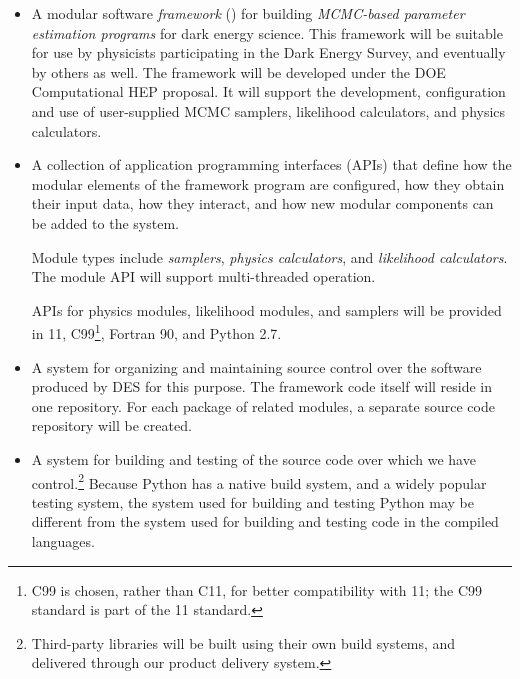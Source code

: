 \documentclass[draftmode,draftwater]{memarticle}
\newcommand{\facs}{\name{FACS}\xspace}
\newcommand{\cosmosis}{\name{CosmoSIS}\xspace}
\begin{document}
\begin{itemize}

\item A modular software \emph{framework} (\cosmosis) for building \emph{MCMC-based
   parameter estimation programs} for dark energy science. This
  framework will be suitable for use by physicists participating in the
  Dark Energy Survey, and eventually by others as well. The framework
  will be developed under the DOE Computational HEP \facs proposal.
  It will
  support the development, configuration and use of
  user-supplied MCMC samplers, likelihood calculators, and physics
  calculators.

\item A collection of application programming interfaces (APIs) that
  define how the modular elements of the framework program are
  configured, how they obtain their input data, how they interact, and
  how new modular components can be added to the system.

  Module types include \emph{samplers}, \emph{physics calculators}, and
  \emph{likelihood calculators}. The module API will support
  multi-threaded operation.


  APIs for physics modules, likelihood modules, and samplers will be provided in
  \cpp{}11, C99\footnote{C99 is chosen, rather than C11, for better
    compatibility with \cpp{}11; the C99 standard is part of the
    \cpp{}11 standard.}, Fortran 90, and Python 2.7.

\item A system for organizing and maintaining source control over the
  software produced by DES for this purpose. The \cosmosis framework code
  itself will reside in one repository. For each package of related
  modules, a separate source code repository will be created.

\item A system for building and testing of the source code over which we
  have control.\footnote{Third-party libraries will be built using their
    own build systems, and delivered through our product delivery
    system.} Because Python has a native build system, and a widely
  popular testing system, the system used for building and testing
  Python may be different from the system used for building and testing
  code in the compiled languages.


\end{itemize}
\end{document}
